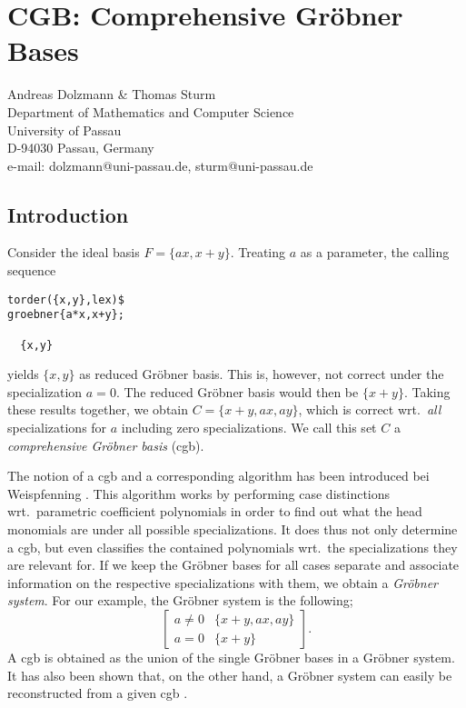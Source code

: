 \chapter{CGB: Comprehensive Gr\"obner Bases}
\label{CGB}


{\footnotesize
\begin{center}
Andreas Dolzmann \& Thomas Sturm\\
Department of Mathematics and Computer Science\\ University of Passau\\
D-94030 Passau, Germany\\[1ex] 
e-mail: dolzmann@uni-passau.de, sturm@uni-passau.de
\end{center}
}


\section{Introduction}
Consider the ideal basis $F=\{ax,x+y\}$. Treating $a$ as a parameter,
the calling sequence
\begin{verbatim}
torder({x,y},lex)$
groebner{a*x,x+y};

  {x,y}
\end{verbatim}
yields $\{x,y\}$ as reduced Gr\"obner basis. This is, however, not
correct under the specialization $a=0$. The reduced Gr\"obner basis
would then be $\{x+y\}$. Taking these results together, we obtain
$C=\{x+y,ax,ay\}$, which is correct wrt.~{\em all} specializations for
$a$ including zero specializations. We call this set $C$ a {\em
comprehensive Gr\"obner basis} ({\sc cgb}).

The notion of a {\sc cgb} and a corresponding algorithm has been
introduced bei Weispfenning \cite{Weispfenning:92}. This algorithm
works by performing case distinctions wrt.~parametric coefficient
polynomials in order to find out what the head monomials are under all
possible specializations. It does thus not only determine a {\sc cgb},
but even classifies the contained polynomials wrt.~the specializations
they are relevant for. If we keep the Gr\"obner bases for all cases
separate and associate information on the respective specializations
with them, we obtain a {\em Gr\"obner system}. For our example, the
Gr\"obner system is the following;
$$
\left[
\begin{array}{c|c}
a\neq0 & \{x+y,ax,ay\}\\
a=0 & \{x+y\}
\end{array}
\right].
$$
A {\sc cgb} is obtained as the union of the single Gr\"obner bases in
a Gr\"obner system. It has also been shown that, on the other hand, a
Gr\"obner system can easily be reconstructed from a given {\sc cgb}
\cite{Weispfenning:92}.

